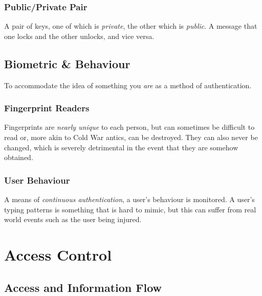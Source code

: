\documentclass{article}
\begin{document}
\subsubsection{Public/Private Pair}

A pair of keys, one of which is \textit{private}, the other which is \textit{public}. A message that one locks and the other unlocks, and vice versa.

\subsection{Biometric \& Behaviour}

To accommodate the idea of something you \textit{are} as a method of authentication.

\subsubsection{Fingerprint Readers}

Fingerprints are \textit{nearly unique} to each person, but can sometimes be difficult to read or, more akin to Cold War antics, can be destroyed. They can also never be changed, which is severely detrimental in the event that they are somehow obtained.

\subsubsection{User Behaviour}

A means of \textit{continuous authentication}, a user's behaviour is monitored. A user's typing patterns is something that is hard to mimic, but this can suffer from real world events such as the user being injured.

\section{Access Control}

\subsection{Access and Information Flow}
\end{document}
